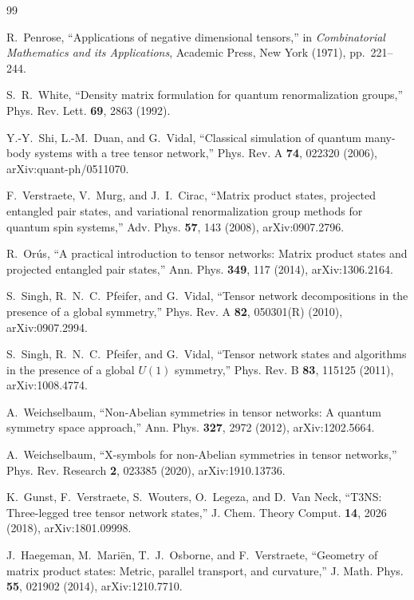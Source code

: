 \documentclass[11pt]{article}
\begin{document}
\small
\begin{thebibliography}{99}
\raggedright

R.~Penrose,
``Applications of negative dimensional tensors,''
in \emph{Combinatorial Mathematics and its Applications},
Academic Press, New York (1971), pp.~221--244.

S.~R.~White,
``Density matrix formulation for quantum renormalization groups,''
Phys. Rev. Lett. \textbf{69}, 2863 (1992).

Y.-Y.~Shi, L.-M.~Duan, and G.~Vidal,
``Classical simulation of quantum many-body systems with a tree tensor
network,''
Phys. Rev. A \textbf{74}, 022320 (2006),
arXiv:quant-ph/0511070.

F.~Verstraete, V.~Murg, and J.~I.~Cirac,
``Matrix product states, projected entangled pair states, and variational
renormalization group methods for quantum spin systems,''
Adv. Phys. \textbf{57}, 143 (2008),
arXiv:0907.2796.

R.~Or\'us,
``A practical introduction to tensor networks: Matrix product states and
projected entangled pair states,''
Ann. Phys. \textbf{349}, 117 (2014),
arXiv:1306.2164.

S.~Singh, R.~N.~C.~Pfeifer, and G.~Vidal,
``Tensor network decompositions in the presence of a global symmetry,''
Phys. Rev. A \textbf{82}, 050301(R) (2010),
arXiv:0907.2994.

S.~Singh, R.~N.~C.~Pfeifer, and G.~Vidal,
``Tensor network states and algorithms in the presence of a global
\(U(1)\) symmetry,''
Phys. Rev. B \textbf{83}, 115125 (2011),
arXiv:1008.4774.

A.~Weichselbaum,
``Non-Abelian symmetries in tensor networks: A quantum symmetry space
approach,''
Ann. Phys. \textbf{327}, 2972 (2012),
arXiv:1202.5664.

A.~Weichselbaum,
``X-symbols for non-Abelian symmetries in tensor networks,''
Phys. Rev. Research \textbf{2}, 023385 (2020),
arXiv:1910.13736.

K.~Gunst, F.~Verstraete, S.~Wouters, O.~Legeza, and D.~Van Neck,
``T3NS: Three-legged tree tensor network states,''
J. Chem. Theory Comput. \textbf{14}, 2026 (2018),
arXiv:1801.09998.

J.~Haegeman, M.~Mari\"en, T.~J.~Osborne, and F.~Verstraete,
``Geometry of matrix product states: Metric, parallel transport, and
curvature,''
J. Math. Phys. \textbf{55}, 021902 (2014),
arXiv:1210.7710.


\end{thebibliography}
\end{document}
